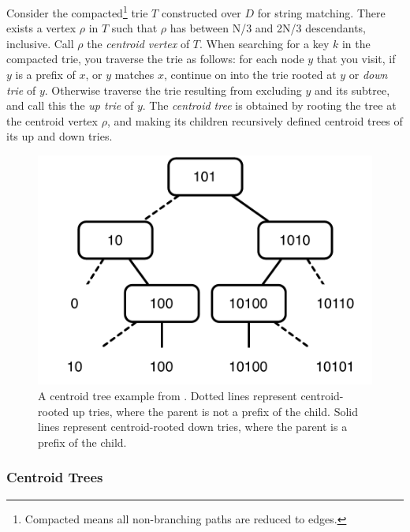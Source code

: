 \documentclass[preprint]{style}
\begin{document}
\vfill

Consider the compacted\footnote{Compacted means all non-branching paths are
reduced to edges.} trie $T$ constructed over $D$ for string matching. There exists a
vertex $\rho$ in $T$ such that $\rho$ has between N/3 and 2N/3 descendants,
inclusive. Call $\rho$ the \emph{centroid vertex} of $T$. When searching for a
key $k$ in the compacted trie, you traverse the trie as follows: for each node
$y$ that you visit, if $y$ is a prefix of $x$, or $y$ matches $x$, continue on
into the trie rooted at $y$ or \emph{down trie} of $y$. Otherwise traverse the
trie resulting from excluding $y$ and its subtree, and call this the \emph{up trie} of $y$. The \emph{centroid tree} is
obtained by rooting the tree at the centroid vertex $\rho$, and making its
children recursively defined centroid trees of its up and down tries. 



\begin{figure}
\begin{center}
	\includegraphics[width=0.8\columnwidth]{figures/centroidtreeexample.pdf}
\end{center}
\caption{A centroid tree example from \cite{BenderFaKu06}. Dotted lines
represent centroid-rooted up tries, where the parent is not a prefix of the
child. Solid lines represent centroid-rooted down tries, where the parent is a
prefix of the child.}
\label{fig:centroid}
\end{figure}

\newpage

\subsubsection{Centroid Trees} %
\end{document}
